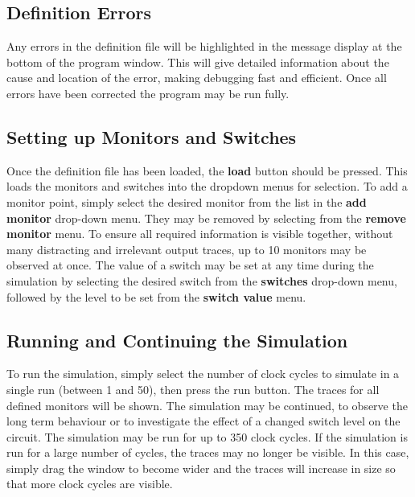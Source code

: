 \documentclass[a4paper,10pt]{article}  %
\begin{document}
\subsection{Definition Errors}

Any errors in the definition file will be highlighted in the message
display at the bottom of the program window. This will give detailed
information about the cause and location of the error, making
debugging fast and efficient. Once all errors have been corrected the
program may be run fully.

\subsection{Setting up Monitors and Switches}

Once the definition file has been loaded, the \textbf{load} button
should be pressed. This loads the monitors and switches into the
dropdown menus for selection. To add a monitor point, simply select
the desired monitor from the list in the \textbf{add monitor}
drop-down menu. They may be removed by selecting from the
\textbf{remove monitor} menu. To ensure all required information is
visible together, without many distracting and irrelevant output
traces, up to 10 monitors may be observed at once. The value of a
switch may be set at any time during the simulation by selecting the
desired switch from the \textbf{switches} drop-down menu, followed by
the level to be set from the \textbf{switch value} menu.

\subsection{Running and Continuing the Simulation}

To run the simulation, simply select the number of clock cycles to
simulate in a single run (between 1 and 50), then press the run
button. The traces for all defined monitors will be shown. The
simulation may be continued, to observe the long term behaviour or to
investigate the effect of a changed switch level on the circuit. The
simulation may be run for up to 350 clock cycles. If the simulation is
run for a large number of cycles, the traces may no longer be
visible. In this case, simply drag the window to become wider and the
traces will increase in size so that more clock cycles are visible. 
\end{document}
